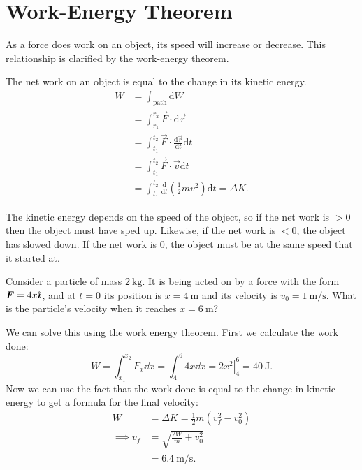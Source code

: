 \documentclass[../classical_mechanics.tex]{subfiles}
\begin{document}
    \section{Work-Energy Theorem}\label{sec:work-energy-theorem}
        As a force does work on an object, its speed will increase or decrease.
        This relationship is clarified by the work-energy theorem.
        \begin{theorem}
            The net work on an object is equal to the change in its kinetic energy.
            \begin{align}
                W&=\int_\mathrm{path}\mathrm{d}W\\
                &=\int_{r_1}^{r_2}\vec{F}\cdot\mathrm{d}\vec{r}\\
                &=\int_{t_1}^{t_2}\vec{F}\cdot\frac{\mathrm{d}\vec{r}}{\mathrm{d}t}\mathrm{d}t\\
                &=\int_{t_1}^{t_2}\vec{F}\cdot\vec{v}\mathrm{d}t\\
                &=\int_{t_1}^{t_2}\frac{\mathrm{d}}{\mathrm{d}t}\left(\frac{1}{2}mv^2\right)\mathrm{d}t=\Delta K.
            \end{align}
        \end{theorem}
        The kinetic energy depends on the speed of the object, so if the net work is $>0$ then the object must have sped up.
        Likewise, if the net work is $<0$, the object has slowed down.
        If the net work is 0, the object must be at the same speed that it started at.
        \begin{example}
            Consider a particle of mass $\qty{2}{\kilogram}$.
            It is being acted on by a force with the form $\boldsymbol{F}=4x\hat{\boldsymbol{\imath}}$, and at $t=0$ its position is $x=\qty{4}{\meter}$ and its velocity is $v_0=\qty{1}{\meter\per\second}$.
            What is the particle's velocity when it reaches $x=\qty{6}{\meter}$?

            We can solve this using the work energy theorem.
            First we calculate the work done:
            \begin{equation}
                W=\int_{x_1}^{x_2}F_x\dd{x}=\int_{4}^{6}4x\dd{x}=\left.2x^2\right|_4^6=\qty{40}{\joule}.
            \end{equation}
            Now we can use the fact that the work done is equal to the change in kinetic energy to get a formula for the final velocity:
            \begin{align}
                W&=\Delta K=\frac{1}{2}m(v_f^2-v_0^2)\\
                \implies v_f&=\sqrt{\frac{2W}{m}+v_0^2}\\
                &=\qty{6.4}{\meter\per\second}.
            \end{align}
        \end{example}
\end{document}
